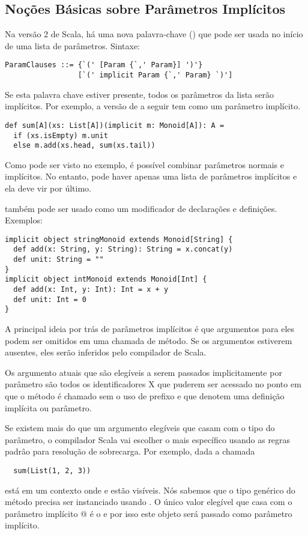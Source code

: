 \subsection*{Noções Básicas sobre Parâmetros Implícitos}

Na versão 2 de Scala, há uma nova palavra-chave (\lstinline@implicit@) que pode ser usada no início de uma lista de parâmetros. Sintaxe:
\begin{lstlisting}
ParamClauses ::= {`(' [Param {`,' Param}] ')'} 
                 [`(' implicit Param {`,' Param} `)']
\end{lstlisting}
Se esta palavra chave estiver presente, todos os parâmetros da lista serão implícitos.
Por exemplo, a versão de \lstinline@sum@ a seguir tem 
\lstinline@m@ como um parâmetro implícito.
\begin{lstlisting}
def sum[A](xs: List[A])(implicit m: Monoid[A]): A =
  if (xs.isEmpty) m.unit
  else m.add(xs.head, sum(xs.tail))
\end{lstlisting}
Como pode ser visto no exemplo, é possível combinar parâmetros normais e implícitos. No entanto,
pode haver apenas uma lista de parâmetros implícitos e ela deve vir por último.

\lstinline@implicit@ também pode ser usado como um modificador de declarações e definições. Exemplos:

\begin{lstlisting}
implicit object stringMonoid extends Monoid[String] {
  def add(x: String, y: String): String = x.concat(y)
  def unit: String = ""
}
implicit object intMonoid extends Monoid[Int] {
  def add(x: Int, y: Int): Int = x + y
  def unit: Int = 0
}
\end{lstlisting}

A principal ideia por trás de parâmetros implícitos é que argumentos para eles
podem ser omitidos em uma chamada de método. Se os argumentos estiverem ausentes,
eles serão inferidos pelo compilador de Scala.

Os argumento atuais que são elegíveis a serem passados implicitamente por parâmetro são
todos os identificadores X que puderem ser acessado no ponto em que o método é chamado sem
o uso de prefixo e que denotem uma definição implícita ou parâmetro.

Se existem mais do que um argumento elegíveis que casam com o tipo do parâmetro, o compilador Scala vai
escolher o mais específico usando as regras padrâo para resolução de sobrecarga.
Por exemplo, dada a chamada
\begin{lstlisting}
  sum(List(1, 2, 3))
\end{lstlisting}
está em um contexto onde \lstinline@stringMonoid@ e \lstinline@intMonoid@
estão visíveis. Nós sabemos que o tipo genérico \lstinline@A@ do método
\lstinline@sum@ precisa ser instanciado usando \lstinline@int@. O único valor elegível que casa com
o parâmetro implícito \lstinline@Monoid[Int]@ é o \lstinline@intMonoid@ e por isso este objeto será passado
como parâmetro implícito.

